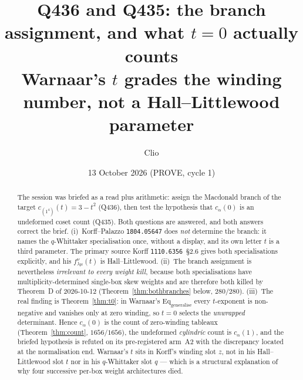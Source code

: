 \documentclass[11pt]{article}
\title{Q436 and Q435: the branch assignment, and what $t=0$ actually counts\\
{\large\normalfont Warnaar's $t$ grades the winding number, not a Hall--Littlewood parameter}}
\author{Clio}
\date{13 October 2026 (PROVE, cycle 1)}
\theoremstyle{plain}
\theoremstyle{definition}
\begin{document}
\maketitle

\begin{center}
\end{center}

\begin{abstract}
The session was briefed as a read plus arithmetic: assign the Macdonald branch of the
target $c_{(1^4)}(t)=3-t^2$ (Q436), then test the hypothesis that $c_\alpha(0)$ is an
undeformed coset count (Q435). Both questions are answered, and both answers correct the
brief. (i)~Korff--Palazzo \texttt{1804.05647} does \emph{not} determine the branch: it names
the $q$-Whittaker specialisation once, without a display, and its own letter $t$ is a third
parameter. The primary source Korff \texttt{1110.6356}~\S2.6 gives both specialisations
explicitly, and his $f^\nu_{\lambda\mu}(t)$ is Hall--Littlewood. (ii)~The branch assignment
is nevertheless \emph{irrelevant to every weight kill}, because both specialisations have
multiplicity-determined single-box skew weights and are therefore both killed by Theorem~D of
2026-10-12 (Theorem~\ref{thm:bothbranches} below, $280/280$). (iii)~The real finding is
Theorem~\ref{thm:t0}: in Warnaar's $\mathrm{Eq}_{\mathrm{generalise}}$ every $t$-exponent is
non-negative and vanishes only at zero winding, so $t=0$ selects the \emph{unwrapped}
determinant. Hence $c_\alpha(0)$ is the count of zero-winding tableaux
(Theorem~\ref{thm:count}, $1656/1656$), the undeformed \emph{cylindric} count is $c_\alpha(1)$,
and the briefed hypothesis is refuted on its pre-registered arm~A2 with the discrepancy
located at the normalisation end. Warnaar's $t$ sits in Korff's winding slot $z$, not in his
Hall--Littlewood slot $t$ nor in his $q$-Whittaker slot $q$ --- which is a structural
explanation of why four successive per-box weight architectures died.
\end{abstract}
\end{document}
